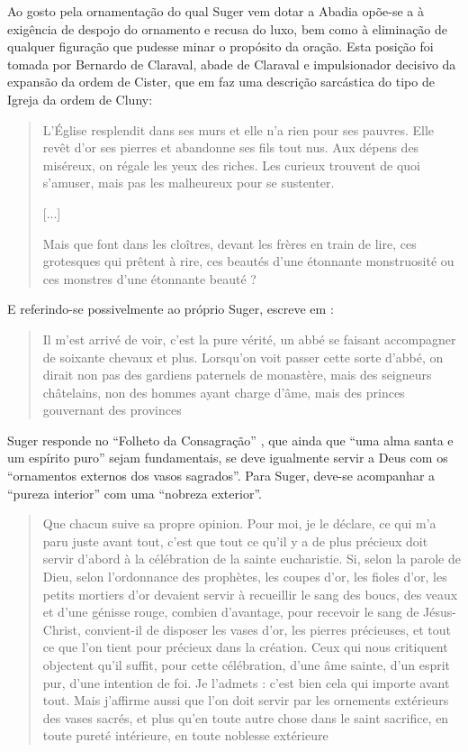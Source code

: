 \documentclass{article}
\begin{document}
Ao gosto pela ornamentação do qual Suger vem dotar a Abadia opõe-se a
à exigência de despojo do ornamento e recusa do luxo, bem como à
eliminação de qualquer figuração que pudesse minar o propósito da
oração. Esta posição foi tomada por Bernardo de Claraval, abade de
Claraval e impulsionador decisivo da expansão da ordem de Cister, que
em \cite{bernard-apologie} faz uma descrição sarcástica do tipo de
Igreja da ordem de Cluny:

\begin{quote}
  L'Église resplendit dans ses murs et elle n'a rien pour ses
  pauvres. Elle revêt d'or ses pierres et abandonne ses fils tout
  nus. Aux dépens des miséreux, on régale les yeux des riches. Les
  curieux trouvent de quoi s'amuser, mais pas les malheureux pour se
  sustenter.

  [...]

  Mais que font dans les cloîtres, devant les frères en train de lire,
  ces grotesques qui prêtent à rire, ces beautés d'une étonnante
  monstruosité ou ces monstres d'une étonnante beauté ?
\end{quote}

E referindo-se possivelmente ao próprio Suger, escreve em
\cite{bernard-critique}:

\begin{quote}
  Il m'est arrivé de voir, c'est la pure vérité, un abbé se faisant
  accompagner de soixante chevaux et plus. Lorsqu'on voit passer cette
  sorte d'abbé, on dirait non pas des gardiens paternels de monastère,
  mais des seigneurs châtelains, non des hommes ayant charge d'âme,
  mais des princes gouvernant des provinces
\end{quote}

Suger responde no ``Folheto da Consagração'' \cite{suger-folheto}, que
ainda que ``uma alma santa e um espírito puro'' sejam fundamentais, se
deve igualmente servir a Deus com os ``ornamentos externos dos vasos
sagrados''. Para Suger, deve-se acompanhar a ``pureza interior'' com
uma ``nobreza exterior''.

\begin{quote}
 Que chacun suive sa propre opinion. Pour moi, je le déclare, ce qui
 m'a paru juste avant tout, c'est que tout ce qu'il y a de plus
 précieux doit servir d'abord à la célébration de la sainte
 eucharistie. Si, selon la parole de Dieu, selon l'ordonnance des
 prophètes, les coupes d'or, les fioles d'or, les petits mortiers d'or
 devaient servir à recueillir le sang des boucs, des veaux et d'une
 génisse rouge, combien d'avantage, pour recevoir le sang de
 Jésus-Christ, convient-il de disposer les vases d'or, les pierres
 précieuses, et tout ce que l'on tient pour précieux dans la
 création. Ceux qui nous critiquent objectent qu'il suffit, pour cette
 célébration, d'une âme sainte, d'un esprit pur, d'une intention de
 foi. Je l'admets : c'est bien cela qui importe avant tout. Mais
 j'affirme aussi que l'on doit servir par les ornements extérieurs des
 vases sacrés, et plus qu'en toute autre chose dans le saint
 sacrifice, en toute pureté intérieure, en toute noblesse extérieure
\end{quote}
\end{document}
